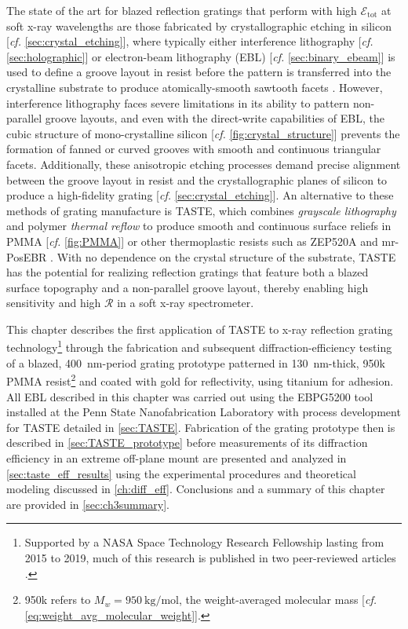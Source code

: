 The state of the art for blazed reflection gratings that perform with high $\mathscr{E}_{\text{tot}}$ at soft x-ray wavelengths are those fabricated by crystallographic etching in silicon [\emph{cf.\@} \cref{sec:crystal_etching}], where typically either interference lithography [\emph{cf.\@} \cref{sec:holographic}] or electron-beam lithography (EBL) [\emph{cf.\@} \cref{sec:binary_ebeam}] is used to define a groove layout in resist before the pattern is transferred into the crystalline substrate to produce atomically-smooth sawtooth facets \cite{Franke97,Chang03,Voronov11,McEntaffer13,DeRoo16,Miles18}. 
However, interference lithography faces severe limitations in its ability to pattern non-parallel groove layouts, and even with the direct-write capabilities of EBL, the cubic structure of mono-crystalline silicon [\emph{cf.\@} \cref{fig:crystal_structure}] prevents the formation of fanned or curved grooves with smooth and continuous triangular facets. 
Additionally, these anisotropic etching processes demand precise alignment between the groove layout in resist and the crystallographic planes of silicon to produce a high-fidelity grating [\emph{cf.\@} \cref{sec:crystal_etching}]. 
An alternative to these methods of grating manufacture is TASTE, which combines \emph{grayscale lithography} and polymer \emph{thermal reflow} to produce smooth and continuous surface reliefs in PMMA [\emph{cf.\@} \cref{fig:PMMA}] or other thermoplastic resists such as ZEP520A and mr-PosEBR \cite{Schleunitz14,Kirchner16,Pfirrmann16}. 
With no dependence on the crystal structure of the substrate, TASTE has the potential for realizing reflection gratings that feature both a blazed surface topography and a non-parallel groove layout, thereby enabling high sensitivity and high $\mathscr{R}$ in a soft x-ray spectrometer. 

This chapter describes the first application of TASTE to x-ray reflection grating technology\footnote{Supported by a NASA Space Technology Research Fellowship lasting from 2015 to 2019, much of this research is published in two peer-reviewed articles \cite{McCoy18,McCoy20}.} through the fabrication and subsequent diffraction-efficiency testing of a blazed, \SI{400}{\nm}-period grating prototype patterned in \SI{130}{\nm}-thick, 950k PMMA resist\footnote{950k refers to $M_w = \SI{950}{\kilogram\per\mole}$, the weight-averaged molecular mass [\emph{cf.\@} \cref{eq:weight_avg_molecular_weight}].} and coated with gold for reflectivity, using titanium for adhesion. 
All EBL described in this chapter was carried out using the \textsc{EBPG5200} tool installed at the Penn State Nanofabrication Laboratory \cite[\emph{cf.\@} \cref{fig:ebeam_tool_pic}]{PSU_MRI_nanofab} with process development for TASTE detailed in \cref{sec:TASTE}. 
Fabrication of the grating prototype then is described in \cref{sec:TASTE_prototype} before measurements of its diffraction efficiency in an extreme off-plane mount are presented and analyzed in \cref{sec:taste_eff_results} using the experimental procedures and theoretical modeling discussed in \cref{ch:diff_eff}. 
Conclusions and a summary of this chapter are provided in \cref{sec:ch3summary}. 

